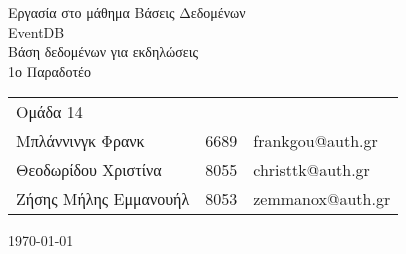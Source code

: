 \documentclass[11pt]{article}
\makeatletter
\newcommand{\ypertitlos}{Εργασία στο μάθημα Βάσεις Δεδομένων}
\newcommand{\titlos}{EventDB}
\newcommand{\ypotitlos}{Βάση δεδομένων για εκδηλώσεις}
\newcommand{\paradoteo}{1ο Παραδοτέο}
\newcommand{\omada}{Ομάδα 14}
\newcommand{\student}[3]{#1&#2&#3\\}
\newcommand{\melosA}{\student{Μπλάννινγκ Φρανκ}{6689}{frankgou@auth.gr}}
\newcommand{\melosB}{\student{Θεοδωρίδου Χριστίνα}{8055}{christtk@auth.gr}}
\newcommand{\melosC}{\student{Ζήσης Μήλης Εμμανουήλ}{8053}{zemmanox@auth.gr}}
\newcommand{\hmnia}{\today}
\makeatother
\begin{document}
  \thispagestyle{empty}
  {\centering
    \Large\ypertitlos\\
    \vspace{7cm}
    \Huge\titlos\\
    \Large\ypotitlos\\
    \vspace{2cm}
  }
  \hfill \paradoteo
  
  \vspace{8cm}
  \begin{tabular}[b]{l l l}
    \omada&&\\
    \melosA
    \melosB 
    \melosC
  \end{tabular}
  
  {\centering
    \vspace{2cm}
    \hmnia\\
  }
  \newpage

  \tableofcontents
  \listoffigures

  \newpage
  
  
  
  
  
  

\end{document}
